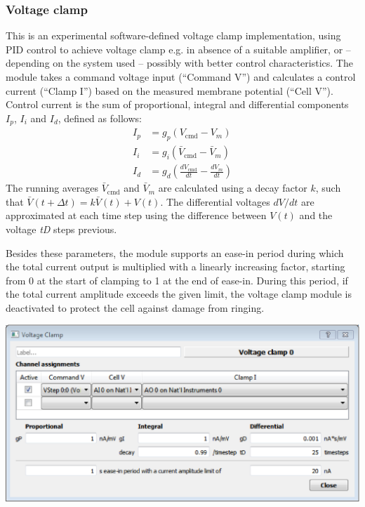 \documentclass{article}
\begin{document}
\subsubsection{Voltage clamp}
This is an experimental software-defined voltage clamp implementation, using PID control to achieve
voltage clamp e.g. in absence of a suitable amplifier, or -- depending on the system used
-- possibly with better control characteristics. The module takes a command voltage input (``Command V'')
and calculates a control current (``Clamp I'') based on the measured membrane potential (``Cell V'').
Control current is the sum of proportional, integral and differential components $I_p$, $I_i$ and $I_d$,
defined as follows:
\begin{align}
I_p &= g_p(V_\text{cmd} - V_m)\\
I_i &= g_i(\bar{V}_\text{cmd} - \bar{V}_m)\\
I_d &= g_d(\frac{dV_\text{cmd}}{dt} - \frac{dV_m}{dt})
\end{align}
The running averages $\bar{V}_\text{cmd}$ and $\bar{V}_m$ are calculated using a decay factor $k$, such
that $\bar{V}(t + \Delta t) = k\bar{V}(t) + V(t)$. The differential voltages $dV/dt$ are approximated at
each time step using the difference between $V(t)$ and the voltage \emph{tD} steps previous.

Besides these parameters, the module supports an ease-in period during which the total current output is
multiplied with a linearly increasing factor, starting from 0 at the start of clamping to 1 at the end
of ease-in. During this period, if the total current amplitude exceeds the given limit, the voltage clamp
module is deactivated to protect the cell against damage from ringing. \\[0.2cm]

\noindent
\parbox{\textwidth}{
	\includegraphics[scale=0.5]{VClamp}
} \\[0.2cm]
\end{document}
